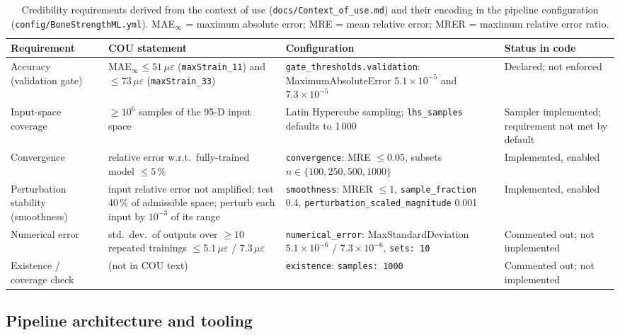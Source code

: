 \begin{table}[htbp]
  \centering
  \caption{Credibility requirements derived from the context of use
    (\texttt{docs/Context\_of\_use.md}) and their encoding in the pipeline
    configuration (\texttt{config/BoneStrengthML.yml}). MAE$_\infty$ = maximum
    absolute error; MRE = mean relative error; MRER = maximum relative error
    ratio.}
  \label{tab:cou}
  \small
  \begin{tabular}{p{2.6cm}p{4.3cm}p{4.6cm}p{2.2cm}}
    \toprule
    Requirement & COU statement & Configuration & Status in code \\
    \midrule
    Accuracy (validation gate) &
      MAE$_\infty \le 51\,\mu\varepsilon$ (\texttt{maxStrain\_11}) and
      $\le 73\,\mu\varepsilon$ (\texttt{maxStrain\_33}) &
      \texttt{gate\_thresholds.validation}: MaximumAbsoluteError $5.1\times10^{-5}$ and $7.3\times10^{-5}$ &
      Declared; not enforced \\
    Input-space coverage &
      $\ge 10^6$ samples of the 95-D input space &
      Latin Hypercube sampling; \texttt{lhs\_samples} defaults to 1\,000 &
      Sampler implemented; requirement not met by default \\
    Convergence &
      relative error w.r.t.\ fully-trained model $\le 5\,\%$ &
      \texttt{convergence}: MRE $\le 0.05$, subsets $n \in \{100, 250, 500, 1000\}$ &
      Implemented, enabled \\
    Perturbation stability (smoothness) &
      input relative error not amplified; test 40\,\% of admissible space; perturb each input by $10^{-3}$ of its range &
      \texttt{smoothness}: MRER $\le 1$, \texttt{sample\_fraction} 0.4, \texttt{perturbation\_scaled\_magnitude} 0.001 &
      Implemented, enabled \\
    Numerical error &
      std.\ dev.\ of outputs over $\ge 10$ repeated trainings $\le 5.1\,\mu\varepsilon$ / $7.3\,\mu\varepsilon$ &
      \texttt{numerical\_error}: MaxStandardDeviation $5.1\times10^{-6}$ / $7.3\times10^{-6}$, \texttt{sets: 10} &
      Commented out; not implemented \\
    Existence / coverage check &
      (not in COU text) &
      \texttt{existence}: \texttt{samples: 1000} &
      Commented out; not implemented \\
    \bottomrule
  \end{tabular}
\end{table}

\subsection{Pipeline architecture and tooling}
\label{sec:methods:arch}

